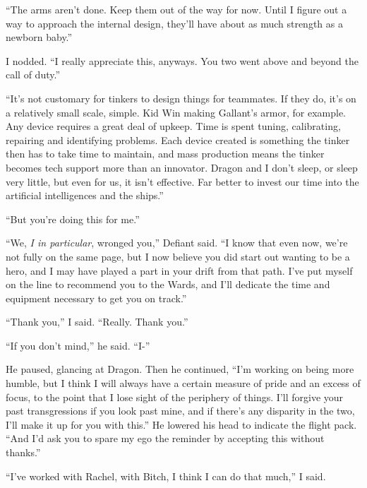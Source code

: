 ``The arms aren't done.  Keep them out of the way for now.  Until I figure out a way to approach the internal design, they'll have about as much strength as a newborn baby.''



I nodded.  ``I really appreciate this, anyways.  You two went above and beyond the call of duty.''



``It's not customary for tinkers to design things for teammates.  If they do, it's on a relatively small scale, simple.  Kid Win making Gallant's armor, for example.  Any device requires a great deal of upkeep.  Time is spent tuning, calibrating, repairing and identifying problems.  Each device created is something the tinker then has to take time to maintain, and mass production means the tinker becomes tech support more than an innovator.  Dragon and I don't sleep, or sleep very little, but even for us, it isn't effective.  Far better to invest our time into the artificial intelligences and the ships.''



``But you're doing this for me.''



``We, \emph{I in particular}, wronged you,'' Defiant said.  ``I know that even now, we're not fully on the same page, but I now believe you did start out wanting to be a hero, and I may have played a part in your drift from that path.  I've put myself on the line to recommend you to the Wards, and I'll dedicate the time and equipment necessary to get you on track.''



``Thank you,'' I said.  ``Really.  Thank you.''



``If you don't mind,'' he said.  ``I-''



He paused, glancing at Dragon.  Then he continued, ``I'm working on being more humble, but I think I will always have a certain measure of pride and an excess of focus, to the point that I lose sight of the periphery of things.  I'll forgive your past transgressions if you look past mine, and if there's any disparity in the two, I'll make it up for you with this.''  He lowered his head to indicate the flight pack.  ``And I'd ask you to spare my ego the reminder by accepting this without thanks.''



``I've worked with Rachel, with Bitch, I think I can do that much,'' I said.



